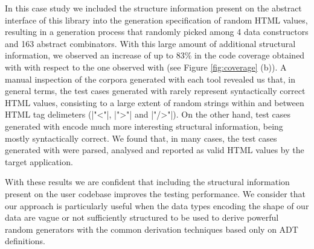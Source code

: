In this case study we included the structure information present on the abstract
interface of this library into the generation specification of random HTML
values, resulting in a generation process that randomly picked among 4 data
constructors and 163 abstract combinators.
%
With this large amount of additional structural information, we observed an
increase of up to $83\%$ in the code coverage obtained with \dragenp with
respect to the one observed with \dragen (see Figure \ref{fig:coverage} (b)).
%
A manual inspection of the corpora generated with each tool revealed us that, in
general terms, the test cases generated with \dragen rarely represent
syntactically correct HTML values, consisting to a large extent of random
strings within and between HTML tag delimeters (|"<"|, |">"| and |"/>"|).
%
On the other hand, test cases generated with \dragenp encode much more
interesting structural information, being mostly syntactically correct.
%
We found that, in many cases, the test cases generated with \dragenp were
parsed, analysed and reported as valid HTML values by the target application.


With these results we are confident that including the structural information
present on the user codebase improves the testing performance.
%
We consider that our approach is particularly useful when the data types
encoding the shape of our data are vague or not sufficiently structured to be
used to derive powerful random generators with the common derivation techniques
based only on ADT definitions.
